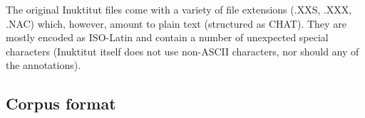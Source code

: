 \documentclass[a4paper, 11pt]{book}
\newcommand{\und}{\underline{{ }}\hspace{0.2mm}}	%
\begin{document}
The original Inuktitut files come with a variety of file extensions (.XXS, .XXX, .NAC) which, however, amount to plain text (structured as CHAT). They are mostly encoded as ISO-Latin and contain a number of unexpected special characters (Inuktitut itself does not use non-ASCII characters, nor should any of the annotations). 

\subsection{Corpus format}

\end{document}
